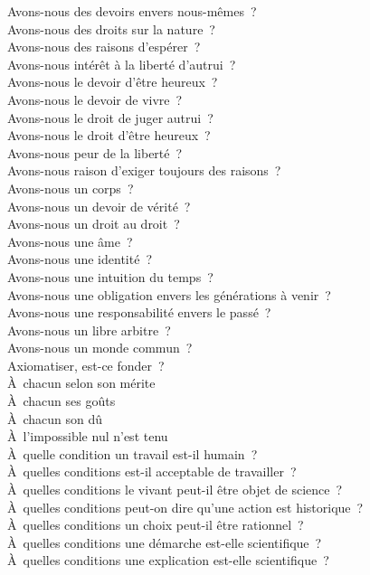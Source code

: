 \documentclass[a4paper,12pt]{article}
\begin{document}
Avons-nous des devoirs envers nous-mêmes ? \\
Avons-nous des droits sur la nature ? \\
Avons-nous des raisons d'espérer ? \\
Avons-nous intérêt à la liberté d'autrui ? \\
Avons-nous le devoir d'être heureux ? \\
Avons-nous le devoir de vivre ? \\
Avons-nous le droit de juger autrui ? \\
Avons-nous le droit d'être heureux ? \\
Avons-nous peur de la liberté ? \\
Avons-nous raison d'exiger toujours des raisons ? \\
Avons-nous un corps ? \\
Avons-nous un devoir de vérité ? \\
Avons-nous un droit au droit ? \\
Avons-nous une âme ? \\
Avons-nous une identité ? \\
Avons-nous une intuition du temps ? \\
Avons-nous une obligation envers les générations à venir ? \\
Avons-nous une responsabilité envers le passé ? \\
Avons-nous un libre arbitre ? \\
Avons-nous un monde commun ? \\
Axiomatiser, est-ce fonder ? \\
À chacun selon son mérite \\
À chacun ses goûts \\
À chacun son dû \\
À l'impossible nul n'est tenu \\
À quelle condition un travail est-il humain ? \\
À quelles conditions est-il acceptable de travailler ? \\
À quelles conditions le vivant peut-il être objet de science ? \\
À quelles conditions peut-on dire qu'une action est historique ? \\
À quelles conditions un choix peut-il être rationnel ? \\
À quelles conditions une démarche est-elle scientifique ? \\
À quelles conditions une explication est-elle scientifique ? \\
\end{document}
